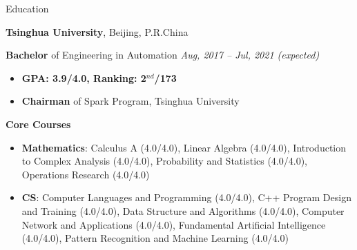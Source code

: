\documentclass{resume} %
\begin{document}

\begin{rSection}{Education}

{\textbf{Tsinghua University}}, {Beijing, P.R.China}

\textbf{Bachelor} of Engineering in Automation \hfill {\em Aug, 2017 -- Jul, 2021 (expected)}
\begin{itemize}
    \item \textbf{GPA: 3.9/4.0, Ranking: 2$^{nd}$/173}
    \item \textbf{Chairman} of Spark Program, Tsinghua University
\end{itemize}

\textbf{Core Courses}
\begin{spacing}{1.05}
\begin{itemize}
    \item \textbf{Mathematics}: Calculus A (4.0/4.0), 
    Linear Algebra (4.0/4.0), 
    Introduction to Complex Analysis (4.0/4.0), 
    Probability and Statistics (4.0/4.0), 
    Operations Research (4.0/4.0)
    \item \textbf{CS}: Computer Languages and Programming (4.0/4.0), 
    C++ Program Design and Training (4.0/4.0), 
    Data Structure and Algorithms (4.0/4.0), 
    Computer Network and Applications (4.0/4.0), 
    Fundamental Artificial Intelligence (4.0/4.0), 
    Pattern Recognition and Machine Learning (4.0/4.0)
\end{itemize}
\end{spacing}

\end{rSection}
\end{document}
